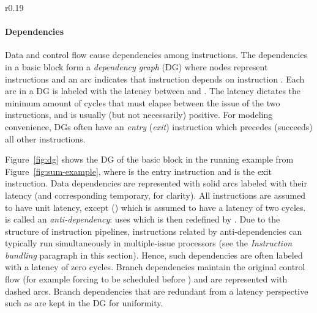 \documentclass[acmsmall,authorversion,nonacm]{acmart}
\newcommand{\var}[2]{}
\begin{document}
\begin{wrapfigure}{r}{0.19\textwidth}
{{
 }}
  \vspace{-0.35cm}\caption{DG of }
  \label{fig:dg}
  \vspace{-0.35cm}\end{wrapfigure}
\paragraph{Dependencies}

Data and control flow cause dependencies among instructions.
The dependencies in a basic block form a \emph{dependency graph} (DG)
where nodes represent instructions and an arc 
indicates that instruction  depends on instruction .
Each arc  in a DG is labeled with the latency
\var{l}{i,j} between  and .
The latency dictates the minimum amount of cycles that must elapse
between the issue of the two instructions, and is usually (but not
necessarily) positive.
For modeling convenience, DGs often have an \emph{entry} (\emph{exit})
instruction which precedes (succeeds) all other instructions.

Figure~\ref{fig:dg} shows the DG of the basic block  in the
running example from Figure~\ref{fig:sum-example}, where
 is the entry instruction and  is the exit
instruction.
Data dependencies are represented with solid arcs labeled with their
latency (and corresponding temporary, for clarity).
All instructions are assumed to have unit latency, except
 () which is assumed to have a
latency of two cycles.
 is called an
\emph{anti-dependency}:  uses  which is then
redefined by .
Due to the structure of instruction pipelines, instructions related by
anti-dependencies can typically run simultaneously in multiple-issue
processors (see the \emph{Instruction bundling} paragraph in this
section).
Hence, such dependencies are often labeled with a latency of zero
cycles.
Branch dependencies maintain the original control flow (for example
forcing  to be scheduled before ) and are
represented with dashed arcs.
Branch dependencies that are redundant from a latency perspective such
as  are kept in the DG for
uniformity.
\end{document}
